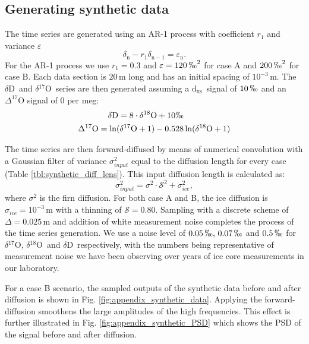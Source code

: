\documentclass[11pt, draftcls, onecolumn]{IEEEtran} %
\numberwithin{equation}{section}
\numberwithin{table}{section}
\numberwithin{figure}{section}
\newcommand{\delOx}{$\delta{}^{18}\mathrm{O}$}
\newcommand{\delOxb}{$\delta{}^{17}\mathrm{O}$}
\newcommand{\delD}{$\delta\mathrm{D}$}
\newcommand{\Dxs}{$\mathrm{d_{xs}}$}
\begin{document}
\begin{appendices}
\section{Generating synthetic data}	\label{sec:appendix_synthetic}

The time series are generated using an AR-1 process with coefficient $r_1$ and variance $\varepsilon$
\begin{equation}
\delta_{\mathrm{n}} - r_1 \delta_{\mathrm{n-1}} = \varepsilon_{\mathrm{n}}.
\label{eq:appen_ar1}
\end{equation}
For the AR-1 process we use $r_1 = 0.3$ and $\varepsilon = 120\,\permil^2$ for case A and $200\,\permil^2$ for case B.
Each data section is $20\, \mathrm{m}$ long and has an initial spacing of 
$10^{-3}\, \mathrm{m}$. The \delD~and \delOxb~series are then
generated assuming a \Dxs~signal of $10\,\permil$ and an
$\Delta^{17}\mathrm{O}$ signal of 0 per meg:
\begin{align} 
\delta\mathrm{D} = 8 \cdot \delta^{18}\mathrm{O} + 10 \permil&\\
\Delta^{17}\mathrm{O} = \ln(\delta^{17}\mathrm{O}+1) - 0.528&\ln(\delta^{18}\mathrm{O} +1)
\end{align}

The time series are then forward-diffused by means of numerical convolution 
with a Gaussian filter of variance $\sigma^2_{input}$ equal to the diffusion length 
for every case (Table \ref{tbl:synthetic_diff_lens}). 
This input diffusion length is calculated as:
\begin{equation}
\sigma^2_{input} = \sigma^2 \cdot \mathcal{S}^2 + \sigma^2_{ice},
\end{equation}
where $\sigma^2 $ is the firn diffusion. For both case A and B, the ice diffusion is $\sigma_{ice} = 10^{-3}\,\mathrm{m}$ with a thinning of $\mathcal{S} = 0.80$.
Sampling with a discrete scheme of $\Delta = 0.025\, \mathrm{m}$ and 
addition of white measurement noise completes the process
of the time series generation. We use a noise level of $0.05\,\permil, \,0.07\,\permil$ and $0.5\,\permil$ 
for \delOxb, \delOx~and \delD~respectively, with the numbers 
being representative of measurement noise we have been 
observing over years of ice core measurements in our laboratory.

For a case B scenario, the sampled outputs of the synthetic data before and after diffusion is shown in Fig. \ref{fig:appendix_synthetic_data}.
Applying the forward-diffusion smoothens the large amplitudes of the high frequencies. 
This effect is further illustrated in Fig. \ref{fig:appendix_synthetic_PSD} which shows the PSD of the signal before and after diffusion.


\end{appendices}
\end{document}
